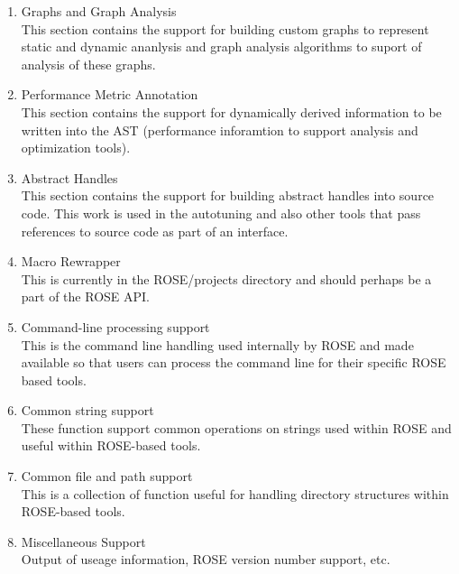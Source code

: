\begin{enumerate}
\begin{enumerate}
      \item Graphs and Graph Analysis \\
         This section contains the support for building custom graphs to represent static
         and dynamic ananlysis and graph analysis algorithms to suport of analysis of
         these graphs.

      \item Performance Metric Annotation \\
         This section contains the support for dynamically derived information to be
         written into the AST (performance inforamtion to support analysis and
         optimization tools).

      \item Abstract Handles \\
         This section contains the support for building abstract handles into source code.
         This work is used in the autotuning and also other tools that pass references to
         source code as part of an interface.

      \item Macro Rewrapper \\
         This is currently in the ROSE/projects directory and should perhaps be a part of
         the ROSE API.

      \item Command-line processing support \\
         This is the command line handling used internally by ROSE and made available 
         so that users can process the command line for their specific ROSE based tools.

      \item Common string support \\
         These function support common operations on strings used within ROSE and 
         useful within ROSE-based tools.

      \item Common file and path support \\
         This is a collection of function useful for handling directory structures within
         ROSE-based tools.

      \item Miscellaneous Support \\
         Output of useage information, ROSE version number support, etc.

   \end{enumerate}

\end{enumerate}


